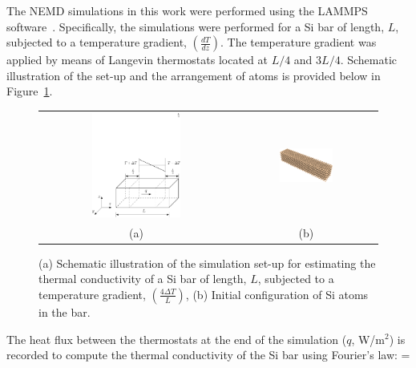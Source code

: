 The NEMD simulations in this work were performed using the LAMMPS software~\cite{Plimpton:2007}.
Specifically, the simulations were performed for a Si bar of length, $L$, subjected to a temperature gradient, 
$\left(\frac{dT}{dz}\right)$. The temperature gradient was applied by means of Langevin thermostats located
at $L/4$ and $3L/4$. Schematic illustration of the set-up and the arrangement of atoms is provided below in 
Figure~\ref{fig:setup}.
%
\begin{figure}[htbp]
\begin{center}
\begin{tabular}{cc}
  \includegraphics[width=0.48\textwidth]{./Figures/schematic}
  &
  \hspace{3mm}
  \includegraphics[width=0.40\textwidth]{./Figures/Sibar_05}
  \\ (a) & (b)
  \end{tabular}
\caption{(a) Schematic illustration of the simulation set-up for estimating the thermal conductivity of a Si bar of
length, $L$, subjected to a temperature gradient, $\left(\frac{4\Delta T}{L}\right)$, (b) 
Initial configuration of Si atoms in the bar.}
\label{fig:setup}
\end{center}
\end{figure}
%
The heat flux between the thermostats at the end of the simulation ($q$, W/m$^2$) is recorded to compute the
thermal conductivity of the Si bar using Fourier's law:
%
\be
 \kappa =  
